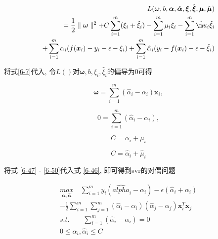 \documentclass[12pt]{article}
\numberwithin{equation}{section}%
\begin{document}
\begin{equation}
\begin{split}
L(\boldsymbol{\omega}, b, \boldsymbol{\alpha}, \hat{\boldsymbol{\alpha}}, \boldsymbol{\xi}, \hat{\boldsymbol{\xi}}, \boldsymbol{\mu}, \hat{\boldsymbol{\mu}})  \\
= \frac{1}{2}\parallel\boldsymbol{\omega}\parallel^{2}+C\sum_{i=1}^{m}(\xi_{i}+\hat{\xi}_{i}) - \sum_{i=1}^{m}\mu_{i}\xi_{i} - \sum_{i=1}^{m}\hat{\m u}_{i}\hat{\xi}_{i}  \\
 + \sum_{i=1}^{m}\alpha_{i}(f(\boldsymbol{x}_{i}) - y_{i} - \epsilon -\xi_{i}) + \sum_{i=1}^{m}\hat{\alpha}_{i}(y_{i} - f(\boldsymbol{x}_{i}) -  \epsilon -                        
 \hat{\xi}_{i}) 
\end{split}
\label{6-46}
\end{equation}

将式\ref{6-7}代入, 令$L()$对$\boldsymbol{\omega}, b, \xi_{i}, \hat{\xi}_{i}$的偏导为0可得

\begin{equation}
\boldsymbol{\omega}=\sum_{i=1}^{m}(\hat{\alpha}_{i}-\alpha_{i})\boldsymbol{x}_{i},
\label{6-47}
\end{equation}

\begin{equation}
0=\sum_{i=1}^{m}(\hat{\alpha}_{i}-\alpha_{i}),
\label{6-48}
\end{equation}

\begin{equation}
C=\alpha_{i} + \mu_{i}
\label{6-49}
\end{equation}

\begin{equation}
C=\hat{\alpha}_{i} +\hat{\mu}_{i}
\label{6-50}
\end{equation}

将式 \ref{6-47} - \ref{6-50}代入式 \ref{6-46}, 即可得到svr的对偶问题

\begin{equation}
\begin{split}
{\underset{\boldsymbol{\alpha},\boldsymbol{\hat{\alpha}}}{max}} \quad \sum_{i=1}^{m}y_{i}(\hat{alpha}_{i} - \alpha_{i}) - \epsilon(\hat{\alpha}_{i} + \alpha_{i}) \\
- \frac{1}{2}\sum_{i=1}^{m}\sum_{j=1}^{m}(\hat{\alpha}_{i} - \alpha_{i})(\hat{\alpha}_{j} - \alpha_{j})\boldsymbol{x}_{i}^{T}\boldsymbol{x}_{j}  \\
s.t. \qquad \sum_{i=1}^{m}(\hat{\alpha}_{i} - \alpha_{i}) = 0 \\
0 \leq \alpha_{i}, \hat{\alpha}_{i} \leq C
\end{split}
\label{6-51}
\end{equation}
\end{document}
